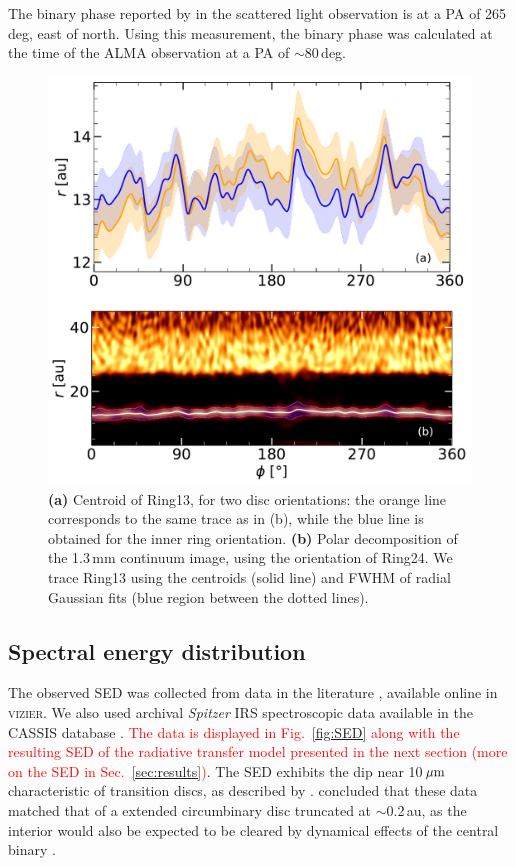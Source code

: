 \documentclass[fleqn,usenatbib,useAMS]{mnras}
\newcommand{\red}[1]{\textcolor{red}{#1}}
\begin{document}
The binary phase reported by \citet{dOrazi} in the scattered light observation is at a PA of 265\,deg, east of north. Using this measurement, the binary phase was calculated at the time of the ALMA observation at a PA of $\sim$80\,deg.

\begin{figure}
    \includegraphics[width=\columnwidth]{polar_ring_aprox_and_diff_inner.pdf}
    \caption{{\bf (a)} Centroid of Ring13, for two disc orientations: the orange line corresponds to the same trace as in (b), while the blue line is obtained for the inner ring orientation. {\bf (b)} Polar decomposition of the 1.3\,mm continuum image, using the orientation of Ring24. We trace Ring13 using the centroids (solid line) and FWHM of radial Gaussian fits (blue region between the dotted lines).}
    \label{fig:polarring}
\end{figure}

\subsection{Spectral energy distribution} \label{subsec:SED}

The observed SED was collected from data in the literature \citep{1988iras....7.....H, 1990A&A...234..230H, Jensen_97, 2000A&A...355L..27H, 2001KFNT...17..409K, 2003yCat.2246....0C, 2007PASJ...59S.369M, 2008PASP..120.1128O, 2010A&A...514A...1I, 2012yCat.2311....0C}, available online in \textsc{vizier}. We also used archival \textit{Spitzer} IRS spectroscopic data available in the CASSIS database \citep{Lebouteiller_2015}. \red{The data is displayed in Fig.~\ref{fig:SED} along with the resulting SED of the radiative transfer model presented in the next section (more on the SED in Sec.~\ref{sec:results})}. The SED exhibits the dip near 10\,$\hbox{$\mu$m}$ characteristic of transition discs, as described by \citet{Rosenfeld_2013}. \citet{Jensen_97} concluded that these data matched that of a extended circumbinary disc truncated at $\sim$0.2\,au, as the interior would also be expected to be cleared by dynamical effects of the central binary \citep{Art_Lu}. 
\end{document}
